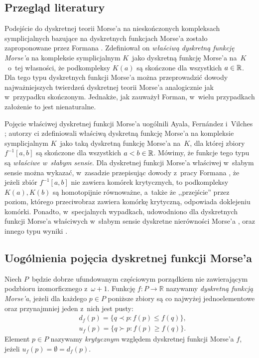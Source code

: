 \subsection{Przegląd literatury}
Podejście do dyskretnej teorii Morse'a na nieskończonych kompleksach symplicjalnych bazujące na dyskretnych funkcjach Morse'a zostało zaproponowane przez Formana \cite{Forman02}. Zdefiniował on \textit{właściwą dyskretną funkcję Morse'a} na kompleksie symplicjalnym $K$~jako dyskretną funkcję Morse'a na~$K$~o~tej własności, że podkompleksy $K(a)$ są skończone dla wszystkich $a\in\mathbb{R}$. Dla tego typu dyskretnych funkcji Morse'a można przeprowadzić dowody najważniejszych twierdzeń dyskretnej teorii Morse'a analogicznie jak w~przypadku skończonym. Jednakże, jak zauważył Forman, w~wielu przypadkach założenie to jest nienaturalne.

Pojęcie właściwej dyskretnej funkcji Morse'a uogólnili Ayala, Fern{\'a}ndez i~Vilches \cite{Ayala07}; autorzy ci zdefiniowali właściwą dyskretną funkcję Morse'a na kompleksie symplicjalnym $K$~jako taką dyskretną funkcję Morse'a na~$K$, dla której zbiory $f^{-1}[a,b]$ są skończone dla wszystkich $a<b\in\mathbb{R}$. Mówimy, że funkcje tego typu są \textit{właściwe w~słabym sensie}. Dla dyskretnej funkcji Morse'a właściwej w~słabym sensie można wykazać, w~zasadzie przepisując dowody z~pracy Formana \cite{Forman98}, że jeżeli zbiór $f^{-1}[a,b]$ nie zawiera komórek krytycznych, to podkompleksy $K(a),K(b)$ są homotopijnie równoważne, a~także że ,,przejście'' przez poziom, którego przeciwobraz zawiera komórkę krytyczną, odpowiada doklejeniu komórki. Ponadto, w~specjalnych wypadkach, udowodniono dla dyskretnych funkcji Morse'a właściwych w~słabym sensie dyskretne nierówności Morse'a \cite{Ayala07,Ayala09}, oraz innego typu wyniki \cite{Ayala08,Ayala09a,Ayala10,Ayala11}.

\subsection{Uogólnienia pojęcia dyskretnej funkcji Morse'a}
Niech $P$~będzie dobrze ufundowanym częściowym porządkiem nie zawierającym podzbioru izomorficznego z~$\omega+ 1$. Funkcję $f\colon P\to \mathbb{R}$ nazywamy \textit{dyskretną funkcją Morse'a}, jeżeli dla każdego $p\in P$ poniższe zbiory są co najwyżej jednoelementowe oraz przynajmniej jeden z~nich jest pusty:
\begin{align*}
&d_f(p)=\{q\prec p:f(p)\leq f(q)\},\\
&u_f(p)=\{q\succ p:f(p)\geq f(q)\}.
\end{align*}
Element $p\in P$ nazywamy \textit{krytycznym} względem dyskretnej funkcji Morse'a $f$, jeżeli $u_f(p)=\emptyset=d_f(p)$. 

